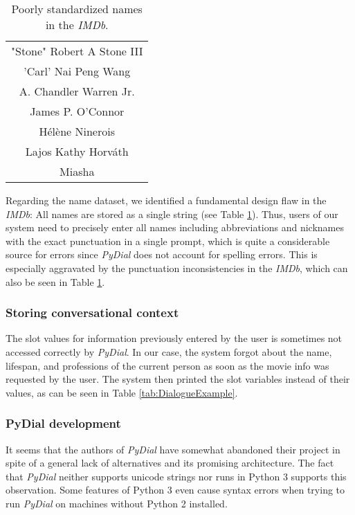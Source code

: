 \documentclass[11pt,a4paper]{article}
\begin{document}
\begin{table}[H]
		\centering
		\begin{tabular}{c}
		\toprule[0.5mm]
		"Stone" Robert A Stone III\\
		'Carl' Nai Peng Wang\\
		A. Chandler Warren Jr.\\
		James P. O'Connor\\
		Hélène Ninerois\\
		Lajos Kathy Horváth\\
		Miasha\\
		\bottomrule[0.5mm]
		\end{tabular}
		\caption{Poorly standardized names in the \textit{IMDb}.}
		\label{tab:IMDb-namestrings}
\end{table}

Regarding the name dataset, we identified a fundamental design flaw in the \textit{IMDb}: All names are stored as a single string (see Table \ref{tab:IMDb-namestrings}). Thus, users of our system need to precisely enter all names including abbreviations and nicknames with the exact punctuation in a single prompt, which is quite a considerable source for errors since \textit{PyDial} does not account for spelling errors. This is especially aggravated by the punctuation inconsistencies in the \textit{IMDb}, which can also be seen in Table \ref{tab:IMDb-namestrings}.    


	\subsubsection{Storing conversational context}
	\label{sec:pydialLimits-context}
	The slot values for information previously entered by the user is sometimes not accessed correctly by \textit{PyDial}. In our case, the system forgot about the name, lifespan, and professions of the current person as soon as the movie info was requested by the user.
The system then printed the slot variables instead of their values, as can be seen in Table \ref{tab:DialogueExample}.

	\subsubsection{PyDial development}
	\label{sec:pydialLimits-development}
	It seems that the authors of \textit{PyDial} have somewhat abandoned their project in spite of a general lack of alternatives and its promising architecture. The fact that \textit{PyDial} neither supports unicode strings nor runs in Python 3 supports this observation. Some features of Python 3 even cause syntax errors when trying to run \textit{PyDial} on machines without Python 2 installed.
	
\end{document}
